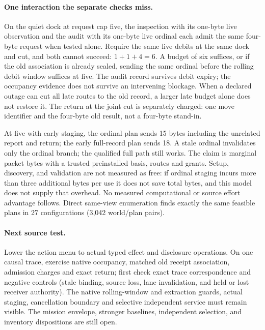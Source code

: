 \documentclass{article}
\begin{document}
\paragraph{One interaction the separate checks miss.}
On the quiet dock at request cap five, the inspection with its one-byte
live observation and the audit with its one-byte live ordinal each
admit the same four-byte request when tested alone.
Require the same live debits at the same dock and cut, and both cannot
succeed: \(1+1+4=6\). A budget of six suffices, or if the old
association is already sealed, sending the same ordinal before the
rolling debit window suffices at five. The audit record survives debit
expiry; the occupancy evidence does not survive an intervening
blockage. When a declared outage can cut all late routes to the old
record, a larger late budget alone does not restore it.
The return at the joint cut is separately charged: one move identifier
and the four-byte old result, not a four-byte stand-in.

At five with early staging, the ordinal plan sends 15 bytes including
the unrelated report and return; the early full-record plan sends 18.
A stale ordinal invalidates only the ordinal branch; the qualified
full path still works. The claim is marginal packet bytes with a trusted
preinstalled basis, routes and grants. Setup, discovery, and validation
are not measured as free: if ordinal staging incurs more than three
additional bytes per use it does not save total bytes, and this model
does not supply that overhead. No measured computational or source
effort advantage follows. Direct same-view enumeration finds exactly
the same feasible plans in 27 configurations (3,042 world/plan pairs).

\paragraph{Next source test.}
Lower the action menu to actual typed effect and disclosure operations.
On one causal trace, exercise native occupancy, matched old receipt
association, admission charges and exact return; first check exact
trace correspondence and negative controls (stale binding, source
loss, lane invalidation, and held or lost receiver authority). The native
rolling-window and extraction guards, actual staging, cancellation
boundary and selective independent service must remain visible. The
mission envelope, stronger baselines, independent selection, and
inventory dispositions are still open.
\end{document}
